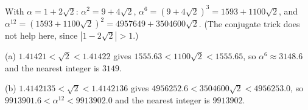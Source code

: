 With $\alpha=1+2\sqrt2$: $\alpha^2=9+4\sqrt2$, $\alpha^6=(9+4\sqrt2)^3=1593+1100\sqrt2$, and $\alpha^{12}=(1593+1100\sqrt2)^2=4957649+3504600\sqrt2$. (The conjugate trick does not help here, since $|1-2\sqrt2|>1$.)

(a) $1.41421<\sqrt2<1.41422$ gives $1555.63<1100\sqrt2<1555.65$, so $\alpha^6\approx3148.6$ and the nearest integer is $\boxed{3149}$.

(b) $1.4142135<\sqrt2<1.4142136$ gives $4956252.6<3504600\sqrt2<4956253.0$, so $9913901.6<\alpha^{12}<9913902.0$ and the nearest integer is $\boxed{9913902}$.
